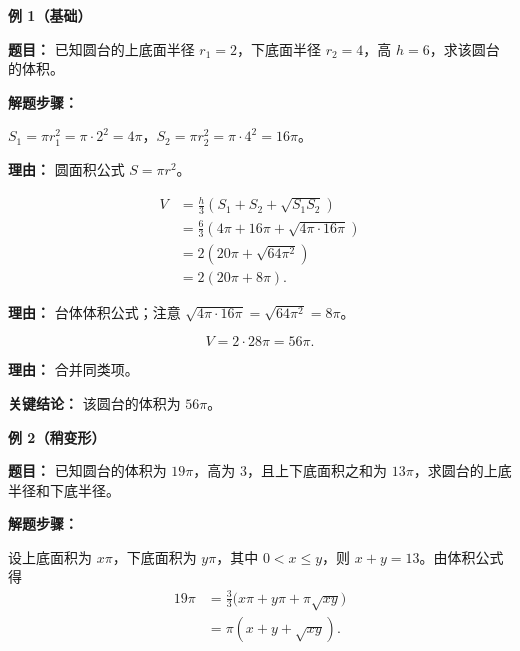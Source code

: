 \begin{examplebox}

	\textbf{\textcolor{CExample}{例 1（基础）}}

	\textbf{\textcolor{CExample}{题目：}} 已知圆台的上底面半径 $r_1=2$，下底面半径 $r_2=4$，高 $h=6$，求该圆台的体积。

	\textbf{\textcolor{CExample}{解题步骤：}}

	\begin{description}[style=nextline, leftmargin=2.8em, labelsep=0.5em, itemsep=0.45em]
		\item[\textbf{第一步（求上下底面积）：}]
		      $S_1=\pi r_1^2=\pi\cdot2^2=4\pi$，$S_2=\pi r_2^2=\pi\cdot4^2=16\pi$。

		      \par\textbf{理由：} 圆面积公式 $S=\pi r^2$。

		\item[\textbf{第二步（代入公式化简）：}]
		      \[
			      \begin{aligned}
				      V & =\frac{h}{3}(S_1+S_2+\sqrt{S_1S_2})            \\
				        & =\frac{6}{3}(4\pi+16\pi+\sqrt{4\pi\cdot16\pi}) \\
				        & =2(20\pi+\sqrt{64\pi^2})                       \\
				        & =2(20\pi+8\pi).
			      \end{aligned}
		      \]

		      \par\textbf{理由：} 台体体积公式；注意 $\sqrt{4\pi\cdot16\pi}=\sqrt{64\pi^2}=8\pi$。

		\item[\textbf{第三步（得体积）：}]
		      \[
			      V=2\cdot28\pi=56\pi.
		      \]

		      \par\textbf{理由：} 合并同类项。
	\end{description}

	\textbf{\textcolor{CExample}{关键结论：}} 该圆台的体积为 $56\pi$。

	\medskip

	\textbf{\textcolor{CExample}{例 2（稍变形）}}

	\textbf{\textcolor{CExample}{题目：}} 已知圆台的体积为 $19\pi$，高为 $3$，且上下底面积之和为 $13\pi$，求圆台的上底半径和下底半径。

	\textbf{\textcolor{CExample}{解题步骤：}}

	\begin{description}[style=nextline, leftmargin=2.8em, labelsep=0.5em, itemsep=0.45em]
		\item[\textbf{第一步（设未知数并建立方程）：}]
		      设上底面积为 $x\pi$，下底面积为 $y\pi$，其中 $0<x\le y$，则 $x+y=13$。由体积公式得
		      \[
			      \begin{aligned}
				      19\pi & =\frac{3}{3}\bigl(x\pi+y\pi+\pi\sqrt{xy}\bigr) \\
				            & =\pi(x+y+\sqrt{xy}).
			      \end{aligned}
		      \]


\end{description}
\end{examplebox}
